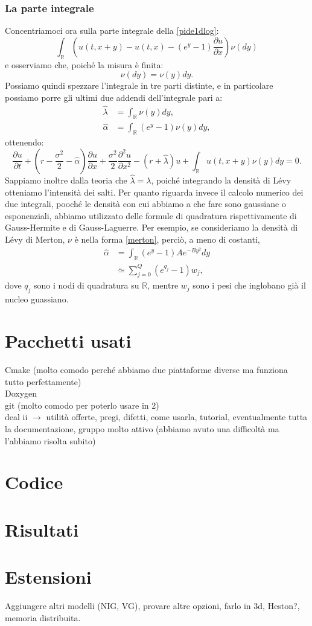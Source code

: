 \documentclass[a4paper,10pt]{report}
\newcommand{\der}[2]{\frac{\partial #1}{\partial #2}}
\newcommand{\dder}[2]{\frac{\partial^2 #1}{\partial #2^2}}
\theoremstyle{osservazione}
\theoremstyle{esempio}
\theoremstyle{notazione}
\theoremstyle{corollario}
\begin{document}
\subsection{La parte integrale}
Concentriamoci ora sulla parte integrale della \ref{pide1dlog}:$$\int_\mathbb{R}\left(u(t,x+y)-u(t,x)-(e^y-1)\der{u}{x}\right)\nu(dy)$$e osserviamo che, poich\'e la misura \`e finita:$$\nu(dy)=\nu(y)dy.$$ Possiamo quindi spezzare l'integrale in tre parti distinte, e in particolare possiamo porre gli ultimi due addendi dell'integrale pari a:
\begin{align*}
\hat{\lambda}&=\int_{\mathbb{R}}\nu(y)dy,\\
\hat{\alpha}&=\int_{\mathbb{R}}(e^y-1)\nu(y)dy,
\end{align*}
ottenendo: $$\der{u}{t}+\left(r-\frac{\sigma^2}{2}-\hat{\alpha}\right)\der{u}{x}+\frac{\sigma^2}{2}\dder{u}{x}-(r+\hat{\lambda})u+\int_\mathbb{R}u(t,x+y)\nu(y)dy=0.$$
Sappiamo inoltre dalla teoria che $\hat{\lambda}=\lambda$, poich\'e integrando la densit\`a di L\'evy otteniamo l'intensit\`a dei salti. Per quanto riguarda invece il calcolo numerico dei due integrali, pooch\'e le densit\`a con cui abbiamo a che fare sono gaussiane o esponenziali, abbiamo utilizzato delle formule di quadratura rispettivamente di Gauss-Hermite e di Gauss-Laguerre. Per esempio, se consideriamo la densit\`a di L\'evy di Merton, $\nu$ \`e nella forma \ref{merton}, perci\`o, a meno di costanti,
\begin{align*}
\hat{\alpha}&=\int_{\mathbb{R}}(e^y-1)Ae^{-By^2}dy\\
&\simeq\sum_{j=0}^{Q}(e^{q_j}-1)w_j,
\end{align*}
dove $q_j$ sono i nodi di quadratura su $\mathbb{R}$, mentre $w_j$ sono i pesi che inglobano gi\`a il nucleo guassiano.
\chapter{Pacchetti usati}
Cmake (molto comodo perch\'e abbiamo due piattaforme diverse ma funziona tutto perfettamente)\\Doxygen\\git (molto comodo per poterlo usare in 2)\\deal ii $\to$ utilit\`a offerte, pregi, difetti, come usarla, tutorial, eventualmente tutta la documentazione, gruppo molto attivo (abbiamo avuto una difficolt\`a ma l'abbiamo risolta subito)

\chapter{Codice}
\chapter{Risultati}
\chapter{Estensioni}
Aggiungere altri modelli (NIG, VG), provare altre opzioni, farlo in 3d, Heston?, memoria distribuita.
\end{document}
